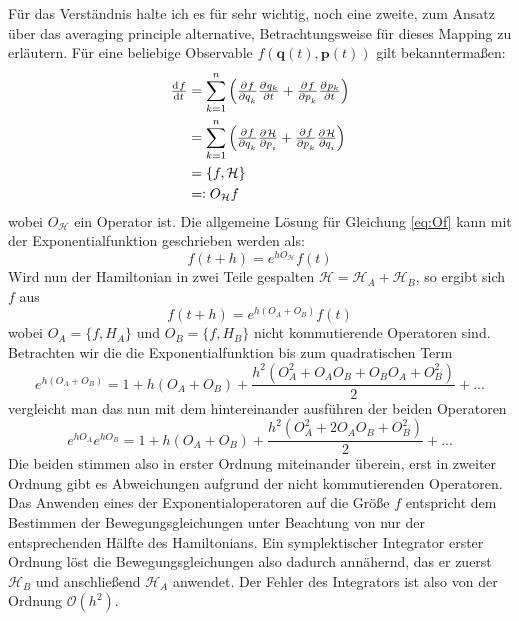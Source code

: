 \documentclass[12pt,a4paper,twoside]{article}
\renewcommand{\cite}{\citep}
\renewcommand{\vec}{\mathbf}
\renewcommand{\H}{\mathcal H}
\begin{document}
Für das Verständnis halte ich es für sehr wichtig, noch eine zweite, zum Ansatz über das averaging principle alternative, Betrachtungsweise für dieses Mapping zu erläutern.
Für eine beliebige Observable $f(\vec q(t),\vec p(t))$ gilt bekanntermaßen:
\begin{align}
\od{f}{t} &= 
\sum_{k=1}^n \left(
	\pd{f}{q_k} \pd{q_k}{t} +
	\pd{f}{p_k} \pd{p_k}{t}
\right) \\ &=
\sum_{k=1}^n \left(
	\pd{f}{q_k} \pd{\H}{p_i} +
	\pd{f}{p_k} \pd{\H}{q_i}
\right) \\ &=
\lbrace f,\H \rbrace \\ &=:
O_\H f \label{eq:Of}
\end{align}
wobei $O_\H$ ein Operator ist. Die allgemeine Lösung für Gleichung \ref{eq:Of} kann mit der Exponentialfunktion geschrieben werden als:
\begin{equation}
f(t+h) = e^{hO_\H}f(t)
\end{equation}
Wird nun der Hamiltonian in zwei Teile gespalten $\H=\H_A+\H_B$, so ergibt sich $f$ aus
\begin{equation}
f(t+h)=e^{h\left(O_A+O_B\right)}f(t)
\end{equation}
wobei $O_A=\lbrace f, H_A \rbrace$ und $O_B=\lbrace f, H_B \rbrace$ nicht kommutierende Operatoren sind\cite{Chambers1999}. Betrachten wir die die Exponentialfunktion bis zum quadratischen Term
\begin{equation}
e^{h\left(O_A+O_B\right)} = 1 + h\left(O_A+O_B\right) + \frac{h^2\left(O_A^2+O_AO_B+O_BO_A+O_B^2\right)}{2} + ... \label{eq:OAB}
\end{equation} %
vergleicht man das nun mit dem hintereinander ausführen der beiden Operatoren
\begin{equation}
e^{hO_A}e^{hO_B} = 1 + h\left(O_A+O_B\right) + \frac{h^2\left(O_A^2+2O_AO_B+O_B^2\right)}{2} + ... \label{eq:OA+B}
\end{equation}
Die beiden stimmen also in erster Ordnung miteinander überein, erst in zweiter Ordnung gibt es Abweichungen aufgrund der nicht kommutierenden Operatoren\cite{Chambers1999}. Das Anwenden eines der Exponentialoperatoren auf die Größe $f$ entspricht dem Bestimmen der Bewegungsgleichungen unter Beachtung von nur der entsprechenden Hälfte des Hamiltonians.
Ein symplektischer Integrator erster Ordnung löst die Bewegungsgleichungen also dadurch annähernd, das er zuerst $\H_B$ und anschließend $\H_A$ anwendet.
Der Fehler des Integrators ist also von der Ordnung $\mathcal{O}(h^2)$.
\end{document}

